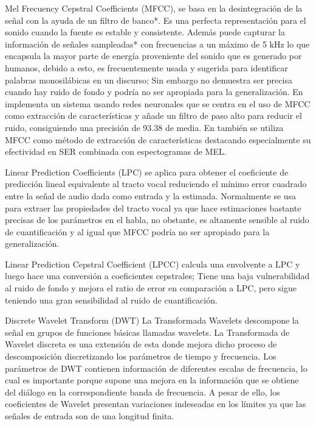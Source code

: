 \documentclass[11pt,a4paper,spanish]{book}
\begin{document}
		Mel Frecuency Cepstral Coefficients (MFCC), se basa en la desintegración de la señal con la ayuda de un filtro de banco*. Es una perfecta representación para el sonido cuando la fuente es estable y consistente. Además puede capturar la información de señales sampleadas* con frecuencias a un máximo de 5 kHz lo que encapsula la mayor parte de energía proveniente del sonido que es generado por humanos, debido a esto, es frecuentemente usada y sugerida para identificar palabras monosilábicas en un discurso; Sin embargo no demuestra ser precisa cuando hay ruido de fondo y podría no ser apropiada para la generalización. En \cite{Sarkania2013} implementa un sistema usando redes neuronales que se centra en el uso de MFCC como extracción de características y añade un filtro  de paso alto para reducir el ruido, consiguiendo una precisión de 93.38 de media. En \cite{Wang2020} también se utiliza MFCC como método de extracción de características destacando especialmente su efectividad en SER combinada con espectogramas de MEL.
		
		Linear Prediction Coefficients (LPC) se aplica para obtener el coeficiente de predicción lineal equivalente al tracto vocal reduciendo el mínimo error cuadrado entre la señal de audio dada como entrada y la estimada. Normalmente se usa para extraer las propiedades del tracto vocal ya que hace estimaciones bastante precisas de los parámetros en el habla, no obstante, es altamente sensible al ruido de cuantificación y al igual que MFCC podría no ser apropiado para la generalización.
		
		Linear Prediction Cepstral Coefficient (LPCC) calcula una envolvente a LPC y luego hace una conversión a coeficientes cepstrales; Tiene una baja vulnerabilidad al ruido de fondo y mejora el ratio de error en comparación a LPC, pero sigue teniendo una gran sensibilidad al ruido de cuantificación.
		
		Discrete Wavelet Transform (DWT) La Transformada Wavelets descompone la señal en grupos de funciones básicas llamadas wavelets. La Transformada de Wavelet discreta es una extensión de esta donde mejora dicho proceso de descomposición discretizando los parámetros de tiempo y frecuencia. Los parámetros de DWT contienen información de diferentes escalas de frecuencia, lo cual es importante porque supone una mejora en la información que se obtiene del diálogo en la correspondiente banda de frecuencia. A pesar de ello, los coeficientes de Wavelet presentan variaciones indeseadas en los límites ya que las señales de entrada son de una longitud finita.
		
\end{document}
